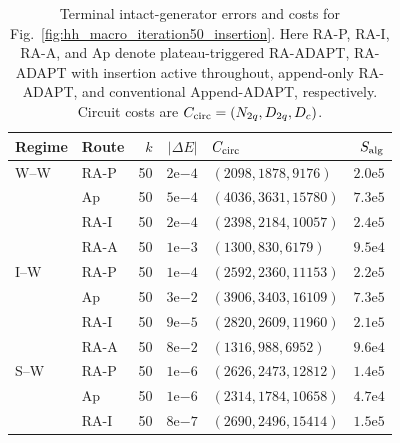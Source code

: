 \documentclass[
  reprint,
  amsmath,
  amssymb,
  aps,
  pra,
  nofootinbib,
  superscriptaddress,
  floatfix
]{revtex4-2}
\begin{document}
\begin{table}[t]
\caption{\label{tab:hh_macro_same_iteration_savings}
Terminal intact-generator errors and costs for Fig.~\ref{fig:hh_macro_iteration50_insertion}.
Here RA-P, RA-I, RA-A, and Ap denote plateau-triggered RA-ADAPT, RA-ADAPT with
insertion active throughout, append-only RA-ADAPT, and conventional
Append-ADAPT, respectively.  Circuit costs are
\(C_{\rm circ}=(N_{2q},D_{2q},D_c)\).}
\centering
\scriptsize
\setlength{\tabcolsep}{1.35pt}
\renewcommand{\arraystretch}{0.98}
\begin{tabular}{@{}llrrlr@{}}
\toprule
Regime & Route & \(k\) & \(\lvert\Delta E\rvert\) & \(C_{\rm circ}\) & \(S_{\rm alg}\) \\
\midrule
W--W & RA-P & 50 & \(2\mathrm{e}{-4}\) & \((2098,1878,9176)\) & \(2.0\mathrm{e}5\) \\
     & Ap   & 50 & \(5\mathrm{e}{-4}\) & \((4036,3631,15780)\) & \(7.3\mathrm{e}5\) \\
     & RA-I & 50 & \(2\mathrm{e}{-4}\) & \((2398,2184,10057)\) & \(2.4\mathrm{e}5\) \\
     & RA-A & 50 & \(1\mathrm{e}{-3}\) & \((1300,830,6179)\) & \(9.5\mathrm{e}4\) \\
\addlinespace[0.35ex]
I--W & RA-P & 50 & \(1\mathrm{e}{-4}\) & \((2592,2360,11153)\) & \(2.2\mathrm{e}5\) \\
     & Ap   & 50 & \(3\mathrm{e}{-2}\) & \((3906,3403,16109)\) & \(7.3\mathrm{e}5\) \\
     & RA-I & 50 & \(9\mathrm{e}{-5}\) & \((2820,2609,11960)\) & \(2.1\mathrm{e}5\) \\
     & RA-A & 50 & \(8\mathrm{e}{-2}\) & \((1316,988,6952)\) & \(9.6\mathrm{e}4\) \\
\addlinespace[0.35ex]
S--W & RA-P & 50 & \(1\mathrm{e}{-6}\) & \((2626,2473,12812)\) & \(1.4\mathrm{e}5\) \\
     & Ap   & 50 & \(1\mathrm{e}{-6}\) & \((2314,1784,10658)\) & \(4.7\mathrm{e}4\) \\
     & RA-I & 50 & \(8\mathrm{e}{-7}\) & \((2690,2496,15414)\) & \(1.5\mathrm{e}5\) \\

\end{tabular}
\end{table}
\end{document}
